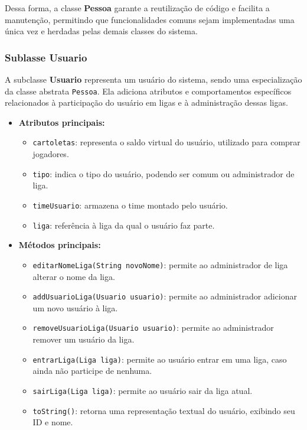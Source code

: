 \documentclass[12pt]{article}
\begin{document}
Dessa forma, a classe \textbf{Pessoa} garante a reutilização de código e facilita a manutenção, permitindo que funcionalidades comuns sejam implementadas uma única vez e herdadas pelas demais classes do sistema.

\subsubsection{Sublasse Usuario}

A subclasse \textbf{Usuario} representa um usuário do sistema, sendo uma especialização da classe abstrata \texttt{Pessoa}. Ela adiciona atributos e comportamentos específicos relacionados à participação do usuário em ligas e à administração dessas ligas.

\begin{itemize}
  \item \textbf{Atributos principais:}
        \begin{itemize}
          \item \texttt{cartoletas}: representa o saldo virtual do usuário, utilizado para comprar jogadores.
          \item \texttt{tipo}: indica o tipo do usuário, podendo ser comum ou administrador de liga.
          \item \texttt{timeUsuario}: armazena o time montado pelo usuário.
          \item \texttt{liga}: referência à liga da qual o usuário faz parte.
        \end{itemize}
  \item \textbf{Métodos principais:}
        \begin{itemize}
          \item \texttt{editarNomeLiga(String novoNome)}: permite ao administrador de liga alterar o nome da liga.
          \item \texttt{addUsuarioLiga(Usuario usuario)}: permite ao administrador adicionar um novo usuário à liga.
          \item \texttt{removeUsuarioLiga(Usuario usuario)}: permite ao administrador remover um usuário da liga.
          \item \texttt{entrarLiga(Liga liga)}: permite ao usuário entrar em uma liga, caso ainda não participe de nenhuma.
          \item \texttt{sairLiga(Liga liga)}: permite ao usuário sair da liga atual.
          \item \texttt{toString()}: retorna uma representação textual do usuário, exibindo seu ID e nome.
        \end{itemize}
\end{itemize}
\end{document}
